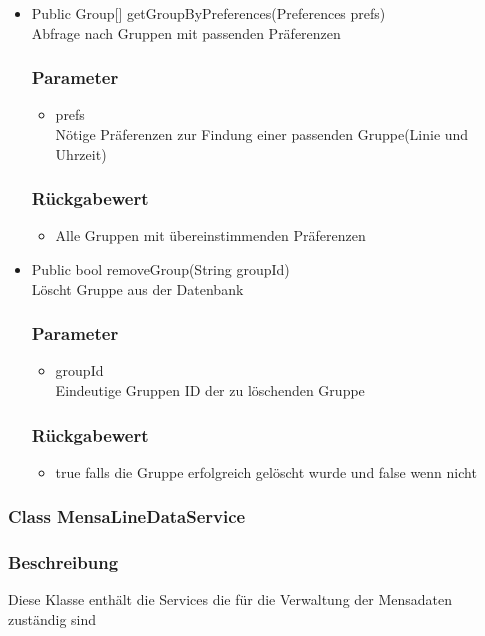 \documentclass[a4paper]{scrreprt}
\begin{document}
\begin{addmargin}[25pt]{0pt}
\begin{itemize}
\item Public Group[] getGroupByPreferences(Preferences prefs)\\
	Abfrage nach Gruppen mit passenden Präferenzen
	\subsubsection*{Parameter}
	\begin{itemize}
	\item prefs \\
		Nötige Präferenzen zur Findung einer passenden Gruppe(Linie und Uhrzeit)
	\end{itemize}
	\subsubsection*{Rückgabewert}
	\begin{itemize}
	\item Alle Gruppen mit übereinstimmenden Präferenzen
	\end{itemize}

\item Public bool removeGroup(String groupId)\\
	Löscht Gruppe aus der Datenbank
	\subsubsection*{Parameter}
	\begin{itemize}
	\item groupId \\
		Eindeutige Gruppen ID der zu löschenden Gruppe
	\end{itemize}
	\subsubsection*{Rückgabewert}
	\begin{itemize}
	\item true falls die Gruppe erfolgreich gelöscht wurde und false wenn nicht
	\end{itemize}
\end{itemize}
\end{addmargin}

\subsubsection{Class MensaLineDataService}
\subsubsection*{Beschreibung}
Diese Klasse enthält die Services die für die Verwaltung der Mensadaten zuständig sind
\end{document}
